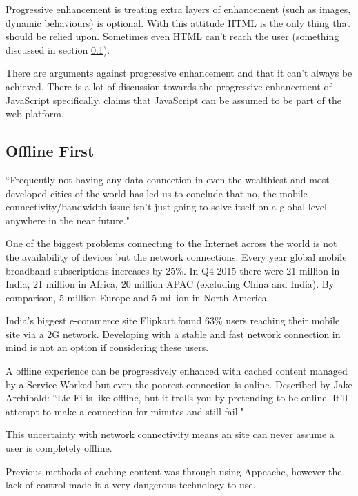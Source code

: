 Progressive enhancement is treating extra layers of enhancement (such as images, dynamic behaviours) is optional. With this attitude HTML is the only thing that should be relied upon. Sometimes even HTML can't reach the user (something discussed in section \ref{l-r--offline-first}). \cite{progressive_enhancement}

There are arguments against progressive enhancement and that it can't always be achieved. There is a lot of discussion towards the progressive enhancement of JavaScript specifically. \cite{progressive_enhancement_dead} claims that JavaScript can be assumed to be part of the web platform.

\subsection{Offline First} \label{l-r--offline-first}

``Frequently not having any data connection in even the wealthiest and most developed cities of the world has led us to conclude that no, the mobile connectivity/bandwidth issue isn’t just going to solve itself on a global level anywhere in the near future." \cite{hello_to_offline_first}

One of the biggest problems connecting to the Internet across the world is not the availability of devices but the network connections. Every year global mobile broadband subscriptions increases by 25\%. In Q4 2015 there were 21 million in India, 21 million in Africa, 20 million APAC (excluding China and India). By comparison, 5 million Europe and 5 million in North America. \cite{ericsson}

India's biggest e-commerce site Flipkart found 63\% users reaching their mobile site via a 2G network. \cite{flipkart} Developing with a stable and fast network connection in mind is not an option if considering these users.

A offline experience can be progressively enhanced with cached content managed by a Service Worked but even the poorest connection is online. Described by Jake Archibald: ``Lie-Fi is like offline, but it trolls you by pretending to be online. It'll attempt to make a connection for minutes and still fail." \cite{supercharging_page_load}

This uncertainty with network connectivity means an site can never assume a user is completely offline.

Previous methods of caching content was through using Appcache, however the lack of control made it a very dangerous technology to use. \cite{appcache}

